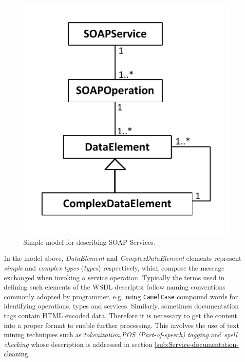 \begin{figure}
\center\includegraphics[scale=0.65]{images/wsdl-simplified}

\caption{Simple model for describing SOAP Services.}
\label{wsdl-Simplified}

\end{figure}

In the model above, \emph{DataElement} and \emph{ComplexDataElement} elements represent \emph{simple }and\emph{ complex types} (\emph{types})
respectively, which compose the message exchanged when invoking a service operation. Typically the terms used in defining such elements of the WSDL descriptor follow naming conventions commonly adopted by programmer, e.g. using \texttt{CamelCase} compound words for identifying operations, types and services. Similarly, sometimes documentation tags contain HTML encoded data. Therefore it is necessary to get the content into a proper format to enable further processing. This involves the use of text mining techniques such as \emph{tokenization},\emph{POS (Part-of-speech) tagging } and \emph{spell checking} whose description is addressed in section \ref{sub:Service-documentation-cleaning}.

